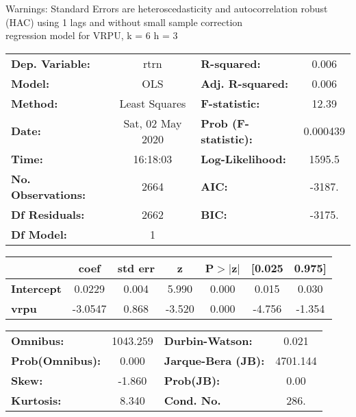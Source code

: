 Warnings: \newline
 [1] Standard Errors are heteroscedasticity and autocorrelation robust (HAC) using 1 lags and without small sample correction\\ 

regression model for VRPU, k = 6 h = 3\begin{center}
\begin{tabular}{lclc}
\toprule
\textbf{Dep. Variable:}    &       rtrn       & \textbf{  R-squared:         } &     0.006   \\
\textbf{Model:}            &       OLS        & \textbf{  Adj. R-squared:    } &     0.006   \\
\textbf{Method:}           &  Least Squares   & \textbf{  F-statistic:       } &     12.39   \\
\textbf{Date:}             & Sat, 02 May 2020 & \textbf{  Prob (F-statistic):} &  0.000439   \\
\textbf{Time:}             &     16:18:03     & \textbf{  Log-Likelihood:    } &    1595.5   \\
\textbf{No. Observations:} &        2664      & \textbf{  AIC:               } &    -3187.   \\
\textbf{Df Residuals:}     &        2662      & \textbf{  BIC:               } &    -3175.   \\
\textbf{Df Model:}         &           1      & \textbf{                     } &             \\
\bottomrule
\end{tabular}
\begin{tabular}{lcccccc}
                   & \textbf{coef} & \textbf{std err} & \textbf{z} & \textbf{P$> |$z$|$} & \textbf{[0.025} & \textbf{0.975]}  \\
\midrule
\textbf{Intercept} &       0.0229  &        0.004     &     5.990  &         0.000        &        0.015    &        0.030     \\
\textbf{vrpu}      &      -3.0547  &        0.868     &    -3.520  &         0.000        &       -4.756    &       -1.354     \\
\bottomrule
\end{tabular}
\begin{tabular}{lclc}
\textbf{Omnibus:}       & 1043.259 & \textbf{  Durbin-Watson:     } &    0.021  \\
\textbf{Prob(Omnibus):} &   0.000  & \textbf{  Jarque-Bera (JB):  } & 4701.144  \\
\textbf{Skew:}          &  -1.860  & \textbf{  Prob(JB):          } &     0.00  \\
\textbf{Kurtosis:}      &   8.340  & \textbf{  Cond. No.          } &     286.  \\
\bottomrule
\end{tabular}
\end{center}


